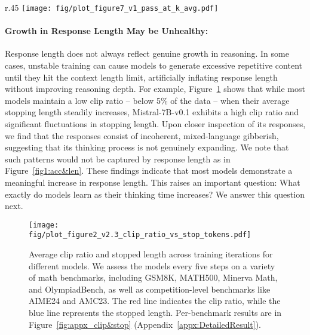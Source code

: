 \begin{wrapfigure}{r}{.45\textwidth}
    \centering
    \texttt{[image: fig/plot\_figure7\_v1\_pass\_at\_k\_avg.pdf]}\vspace{-10pt}
    \caption{Pass@k of Mistral-24B based on the average results from AIME24 and AMC23. }
    \label{fig:different_passk}
\end{wrapfigure}

\paragraph{Growth in Response Length May be Unhealthy:}Response length does not always reflect genuine growth in reasoning. In some cases, unstable training can cause models to generate excessive repetitive content until they hit the context length limit, artificially inflating response length without improving reasoning depth.  For example, Figure~\ref{fig2:clip&stop} shows that while most models maintain a low clip ratio -- below 5\% of the data -- when their average stopping length steadily increases, Mistral-7B-v0.1 exhibits a high clip ratio and significant fluctuations in stopping length. Upon closer inspection of its responses, we find that the responses consist of incoherent, mixed-language gibberish, suggesting that its thinking process is not genuinely expanding.
We note that such patterns would not be captured by response length as in Figure~\ref{fig1:acc&len}.
These findings indicate that most models demonstrate a meaningful increase in response length. This raises an important question: What exactly do models learn as their thinking time increases? We answer this question next.

\begin{figure}[!t]
        \centering
\texttt{[image: fig/plot\_figure2\_v2.3\_clip\_ratio\_vs\_stop\_tokens.pdf]}
\vspace{-10pt}
\caption{Average clip ratio and stopped length across training iterations for different models. We assess the models every five steps on a variety of math benchmarks, including GSM8K, MATH500, Minerva Math, and OlympiadBench, as well as competition-level benchmarks like AIME24 and AMC23. The red line indicates the clip ratio, while the blue line represents the stopped length. Per-benchmark results are in Figure~\ref{fig:appx_clip&stop} (Appendix~\ref{appx:DetailedResult}).}
        \label{fig2:clip&stop}
        \vspace{-10pt}
\end{figure}





